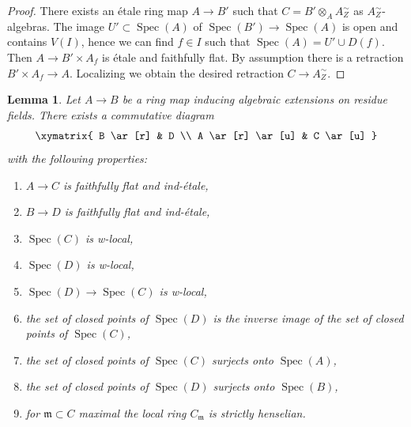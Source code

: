 \documentclass[10pt,a4paper]{article}
\theoremstyle{plain}
\newtheorem{lemma}[subsection]{Lemma}
\theoremstyle{definition}
\theoremstyle{remark}
\numberwithin{equation}{subsection}
\def\Spec{\mathop{\mathrm{Spec}}}
\begin{document}
\begin{proof}
There exists an \'etale ring map $A \to B'$ such that
$C = B' \otimes_A A_Z^\sim$ as $A_Z^\sim$-algebras.
The image $U' \subset \Spec(A)$ of $\Spec(B') \to \Spec(A)$
is open and contains $V(I)$, hence we can find $f \in I$ such
that $\Spec(A) = U' \cup D(f)$. Then $A \to B' \times A_f$
is \'etale and faithfully flat. By assumption there is a retraction
$B' \times A_f \to A$. Localizing we obtain the desired retraction
$C \to A_Z^\sim$.
\end{proof}

\begin{lemma}
\label{lemma-get-w-local-algebraic-residue-field-extensions}
Let $A \to B$ be a ring map inducing algebraic extensions on residue fields.
There exists a commutative diagram
$$
\xymatrix{
B \ar[r] & D \\
A \ar[r] \ar[u] & C \ar[u]
}
$$
with the following properties:
\begin{enumerate}
\item $A \to C$ is faithfully flat and ind-\'etale,
\item $B \to D$ is faithfully flat and ind-\'etale,
\item $\Spec(C)$ is w-local,
\item $\Spec(D)$ is w-local,
\item $\Spec(D) \to \Spec(C)$ is w-local,
\item the set of closed points of $\Spec(D)$ is the inverse image
of the set of closed points of $\Spec(C)$,
\item the set of closed points of $\Spec(C)$ surjects onto $\Spec(A)$,
\item the set of closed points of $\Spec(D)$ surjects onto $\Spec(B)$,
\item for $\mathfrak m \subset C$ maximal the local ring
$C_\mathfrak m$ is strictly henselian.
\end{enumerate}
\end{lemma}
\end{document}
